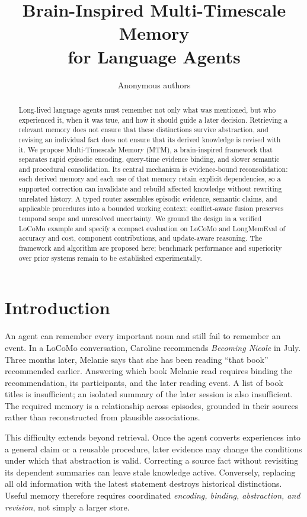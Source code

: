 \documentclass{article}
\title{Brain-Inspired Multi-Timescale Memory\\for Language Agents}
\author{Anonymous authors}
\newcommand{\method}{MTM}
\begin{document}
\maketitle
{}

\begin{abstract}
Long-lived language agents must remember not only what was mentioned, but who
experienced it, when it was true, and how it should guide a later decision.
Retrieving a relevant memory does not ensure that these distinctions survive
abstraction, and revising an individual fact does not ensure that its derived
knowledge is revised with it. We propose Multi-Timescale Memory (\method), a
brain-inspired framework that separates rapid episodic encoding, query-time
evidence binding, and slower semantic and procedural consolidation. Its central
mechanism is evidence-bound reconsolidation: each derived memory and each use
of that memory retain explicit dependencies, so a supported correction can
invalidate and rebuild affected knowledge without rewriting unrelated history.
A typed router assembles episodic evidence, semantic claims, and applicable
procedures into a bounded working context; conflict-aware fusion preserves
temporal scope and unresolved uncertainty. We ground the design in a verified
LoCoMo example and specify a compact evaluation on LoCoMo and LongMemEval of
accuracy and cost, component contributions, and update-aware reasoning. The framework and algorithm
are proposed here; benchmark performance and superiority over prior systems
remain to be established experimentally.
\end{abstract}

\section{Introduction}
An agent can remember every important noun and still fail to remember an event.
In a LoCoMo conversation, Caroline recommends \emph{Becoming Nicole} in July.
Three months later, Melanie says that she has been reading ``that book''
recommended earlier. Answering which book Melanie read requires binding the
recommendation, its participants, and the later reading event. A list of book
titles is insufficient; an isolated summary of the later session is also
insufficient. The required memory is a relationship across episodes, grounded
in their sources rather than reconstructed from plausible associations.

This difficulty extends beyond retrieval. Once the agent converts experiences
into a general claim or a reusable procedure, later evidence may change the
conditions under which that abstraction is valid. Correcting a source fact
without revisiting its dependent summaries can leave stale knowledge active.
Conversely, replacing all old information with the latest statement destroys
historical distinctions. Useful memory therefore requires coordinated
\emph{encoding, binding, abstraction, and revision}, not simply a larger store.
\end{document}
